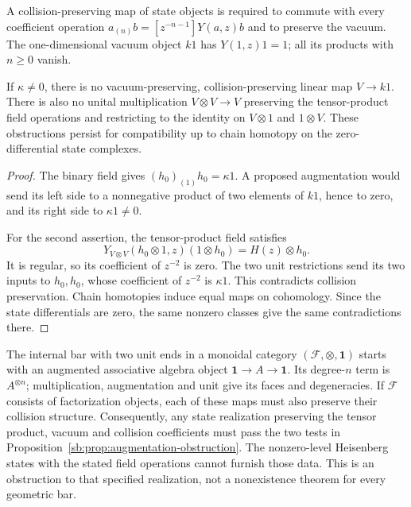 A collision-preserving map of state objects is required to commute
with every coefficient operation
\(a_{(n)}b=[z^{-n-1}]Y(a,z)b\) and to preserve the vacuum.
The one-dimensional vacuum object \(k1\) has
\(Y(1,z)1=1\); all its products with \(n\ge0\) vanish.

\begin{proposition}
\label{sb:prop:augmentation-obstruction}
If \(\kappa\ne0\), there is no vacuum-preserving,
collision-preserving linear map \(V\to k1\).
There is also no unital multiplication \(V\otimes V\to V\)
preserving the tensor-product field operations and restricting to
the identity on \(V\otimes1\) and \(1\otimes V\).
These obstructions persist for compatibility up to chain homotopy
on the zero-differential state complexes.
\end{proposition}

\begin{proof}
The binary field gives \((h_0)_{(1)}h_0=\kappa1\).
A proposed augmentation would send its left side to a nonnegative
product of two elements of \(k1\), hence to zero, and its right
side to \(\kappa1\ne0\).

For the second assertion, the tensor-product field satisfies
\[
 Y_{V\otimes V}(h_0\otimes1,z)(1\otimes h_0)
       =H(z)\otimes h_0.
\]
It is regular, so its coefficient of \(z^{-2}\) is zero.
The two unit restrictions send its two inputs to \(h_0,h_0\),
whose coefficient of \(z^{-2}\) is \(\kappa1\).
This contradicts collision preservation.  Chain homotopies induce
equal maps on cohomology.  Since the state differentials are zero,
the same nonzero classes give the same contradictions there.
\end{proof}

The internal bar with two unit ends in a monoidal category
\((\mathcal F,\otimes,\mathbf1)\) starts with an augmented associative algebra object
\(\mathbf1\to A\to\mathbf1\).
Its degree-\(n\) term is \(A^{\otimes n}\); multiplication,
augmentation and unit give its faces and degeneracies.
If \(\mathcal F\) consists of factorization objects, each of
these maps must also preserve their collision structure.
Consequently, any state realization preserving the tensor product,
vacuum and collision coefficients must pass the two tests in
Proposition~\ref{sb:prop:augmentation-obstruction}.
The nonzero-level Heisenberg states with the stated field operations
cannot furnish those data.  This is an obstruction to that specified
realization, not a nonexistence theorem for every geometric bar.

